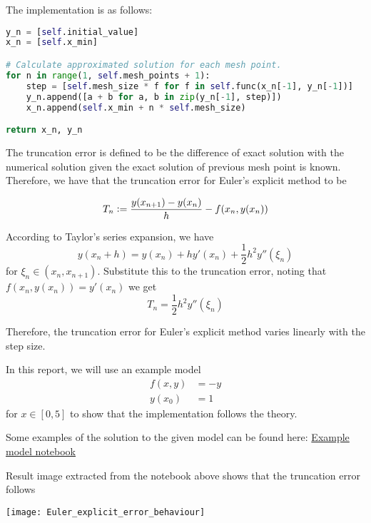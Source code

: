 The implementation is as follows:

\begin{lstlisting}[language=Python]
y_n = [self.initial_value]
x_n = [self.x_min]

# Calculate approximated solution for each mesh point.
for n in range(1, self.mesh_points + 1):
    step = [self.mesh_size * f for f in self.func(x_n[-1], y_n[-1])]
    y_n.append([a + b for a, b in zip(y_n[-1], step)])
    x_n.append(self.x_min + n * self.mesh_size)

return x_n, y_n
\end{lstlisting}

The truncation error is defined to be the difference of exact solution with the numerical solution given the exact solution of previous mesh point is known. Therefore, we have that the truncation error for Euler's explicit method to be

\begin{equation}
\label{eqn:trun_err_def}
    T_n \vcentcolon= \frac{y(x_{n+1}) - y(x_{n})}{h} - f(x_n, y(x_n))
\end{equation}

According to Taylor's series expansion, we have 
\begin{equation}
    y(x_n + h) = y(x_n) + hy'(x_n) + \frac{1}{2}h^2y''(\xi_n)
\end{equation}
for $\xi_n \in (x_n, x_{n+1})$. Substitute this to the truncation error, noting that $f(x_n, y(x_n)) = y'(x_n)$ we get
\begin{equation}
    T_n = \frac{1}{2}h^2y''(\xi_n)
\end{equation}

Therefore, the truncation error for Euler's explicit method varies linearly with the step size.

In this report, we will use an example model 
\begin{align}
\label{eqn:example_model}
    f(x,y) &= -y \\
    y(x_0) &= 1
\end{align}
for $x \in [0, 5]$ to show that the implementation follows the theory.

Some examples of the solution to the given model can be found here: \href{https://nbviewer.jupyter.org/github/FarmHJ/numerical-solver/blob/main/examples/solver_convergence.ipynb}{Example model notebook}

Result image extracted from the notebook above shows that the truncation error follows 

\texttt{[image: Euler\_explicit\_error\_behaviour]}

